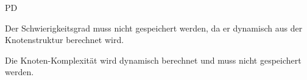 \begin{ids}{\gls{PD}}

	\id[130] Der Schwierigkeitsgrad muss nicht gespeichert werden, da er dynamisch aus der Knotenstruktur berechnet wird.
	
	\id[140] Die Knoten-Komplexität wird dynamisch berechnet und muss nicht gespeichert werden.

\end{ids}
~\\




